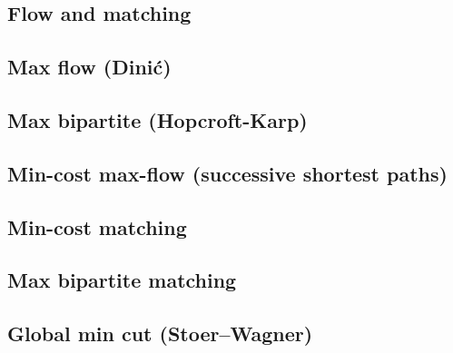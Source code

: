 \documentclass[10pt]{extarticle}
\begin{document}
\begin{multicols*}{3}
\setlength{\parskip}{0.0in}
\tableofcontents
\setlength{\parskip}{0.1in}
\section{Flow and matching}

\subsection{Max flow (Dini\'c)} %


\subsection{Max bipartite (Hopcroft-Karp)} %


\subsection{Min-cost max-flow (successive shortest paths)}


\subsection{Min-cost matching} %


\subsection{Max bipartite matching} %


\subsection{Global min cut (Stoer--Wagner)} %



\end{multicols*}
\end{document}
